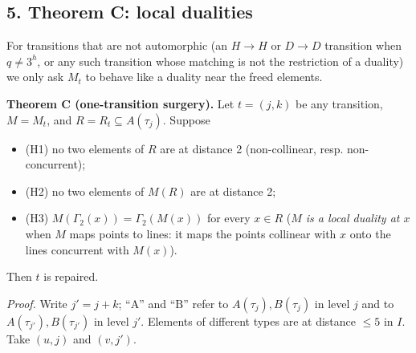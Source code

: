 \documentclass[
  11pt,
]{article}
\providecommand{\tightlist}{%
  \setlength{\itemsep}{0pt}\setlength{\parskip}{0pt}}
\begin{document}
\hypertarget{theorem-c-local-dualities}{%
\subsection{5. Theorem C: local dualities}\label{theorem-c-local-dualities}}

For transitions that are not automorphic (an \(H\to H\) or \(D\to D\) transition when \(q\ne 3^h\), or any such
transition whose matching is not the restriction of a duality) we only ask \(M_t\) to behave like a duality near the
freed elements.

\textbf{Theorem C (one-transition surgery).} Let \(t = (j,k)\) be any transition, \(M = M_t\), and
\(R = R_t\subseteq A(\tau_j)\). Suppose

\begin{itemize}
\tightlist
\item
  (H1) no two elements of \(R\) are at distance 2 (non-collinear, resp. non-concurrent);
\item
  (H2) no two elements of \(M(R)\) are at distance 2;
\item
  (H3) \(M(\Gamma_2(x)) = \Gamma_2(M(x))\) for every \(x\in R\) (\emph{\(M\) is a local duality at \(x\)} when \(M\)
  maps points to lines: it maps the points collinear with \(x\) onto the lines concurrent with \(M(x)\)).
\end{itemize}

Then \(t\) is repaired.

\emph{Proof.} Write \(j' = j+k\); ``\(\mathrm A\)'' and ``\(\mathrm B\)'' refer to \(A(\tau_j), B(\tau_j)\) in level
\(j\) and to \(A(\tau_{j'}), B(\tau_{j'})\) in level \(j'\). Elements of different types are at distance \(\le 5\) in
\(I\). Take \((u,j)\) and \((v,j')\).
\end{document}
